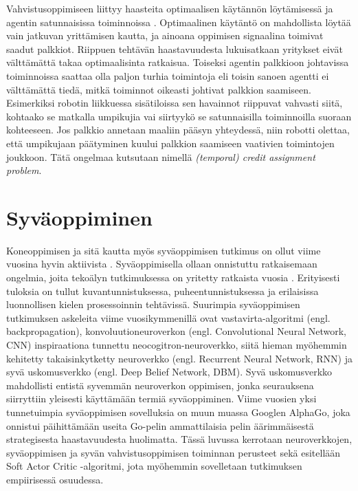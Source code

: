 \documentclass[utf8]{gradu3}
\begin{document}
Vahvistusoppimiseen liittyy haasteita optimaalisen käytännön löytämisessä ja agentin satunnaisissa toiminnoissa \parencite{arulkumaran2017brief}. Optimaalinen käytäntö on mahdollista löytää vain jatkuvan yrittämisen kautta, ja ainoana oppimisen signaalina toimivat saadut palkkiot. Riippuen tehtävän haastavuudesta lukuisatkaan yritykset eivät välttämättä takaa optimaalisinta ratkaisua. Toiseksi agentin palkkioon johtavissa toiminnoissa saattaa olla paljon turhia toimintoja eli toisin sanoen agentti ei välttämättä tiedä, mitkä toiminnot oikeasti johtivat palkkion saamiseen. Esimerkiksi robotin liikkuessa sisätiloissa sen havainnot riippuvat vahvasti siitä, kohtaako se matkalla umpikujia vai siirtyykö se satunnaisilla toiminnoilla suoraan kohteeseen. Jos palkkio annetaan maaliin pääsyn yhteydessä, niin robotti olettaa, että umpikujaan päätyminen kuului palkkion saamiseen vaativien toimintojen joukkoon. Tätä ongelmaa kutsutaan nimellä \textit{(temporal) credit assignment problem}.

\section{Syväoppiminen}

Koneoppimisen ja sitä kautta myös syväoppimisen tutkimus on ollut viime vuosina hyvin aktiivista \parencite{pouyanfar2018survey}. Syväoppimisella ollaan onnistuttu ratkaisemaan ongelmia, joita tekoälyn tutkimuksessa on yritetty ratkaista vuosia \parencite{lecun2015deep,pouyanfar2018survey}. Erityisesti tuloksia on tullut kuvantunnistuksessa, puheentunnistuksessa ja erilaisissa luonnollisen kielen prosessoinnin tehtävissä. Suurimpia syväoppimisen tutkimuksen askeleita viime vuosikymmenillä ovat vastavirta-algoritmi (engl. backpropagation), konvoluutioneuroverkon (engl. Convolutional Neural Network, CNN) inspiraationa tunnettu neocogitron-neuroverkko, siitä hieman myöhemmin kehitetty takaisinkytketty neuroverkko (engl. Recurrent Neural Network, RNN) ja syvä uskomusverkko (engl. Deep Belief Network, DBM). Syvä uskomusverkko mahdollisti entistä syvemmän neuroverkon oppimisen, jonka seurauksena siirryttiin yleisesti käyttämään termiä syväoppiminen. Viime vuosien yksi tunnetuimpia syväoppimisen sovelluksia on muun muassa Googlen AlphaGo, joka onnistui päihittämään useita Go-pelin ammattilaisia pelin äärimmäisestä strategisesta haastavuudesta huolimatta. Tässä luvussa kerrotaan neuroverkkojen, syväoppimisen ja syvän vahvistusoppimisen toiminnan perusteet sekä esitellään Soft Actor Critic -algoritmi, jota myöhemmin sovelletaan tutkimuksen empiirisessä osuudessa.
\end{document}
